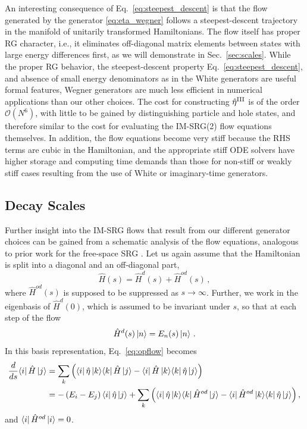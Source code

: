 An interesting consequence of Eq.~\eqref{eq:steepest_descent} is that
the flow generated by the generator \eqref{eq:eta_wegner} follows a
steepest-descent trajectory in the manifold of unitarily transformed
Hamiltonians. The flow itself has proper RG character, i.e., it
eliminates off-diagonal matrix elements between states with large
energy differences first, as we will demonstrate in
Sec.~\ref{sec:scales}. While the proper RG behavior, the
steepest-descent property Eq.~\eqref{eq:steepest_descent}, and absence
of small energy denominators as in the White generators are useful
formal features, Wegner generators are much less efficient in
numerical applications than our other choices. The cost for
constructing $\hat{\eta}^\text{III}$ is of the order $\mathcal{O}(N^6)$,
with little to be gained by distinguishing particle and hole states,
and therefore similar to the cost for evaluating the IM-SRG(2) flow
equations themselves. In addition, the flow equations become very
stiff because the RHS terms are cubic in the Hamiltonian, and the
appropriate stiff ODE solvers have higher storage and computing time
demands than those for non-stiff or weakly stiff cases resulting from
the use of White or imaginary-time generators.


\subsection{\label{sec:scales}Decay Scales}
Further insight into the IM-SRG flows that result from our different generator choices can
be gained from a schematic analysis of the flow equations, analogous to prior work for
the free-space SRG \cite{Anderson:2008hx,Bogner:2010pq}.
Let us again assume that the Hamiltonian is split into a diagonal and an off-diagonal part,
\begin{equation}
  \hat{H}(s)=\hat{H}^d(s) + \hat{H}^{od}(s)\,,
\end{equation}
where $\hat{H}^{od}(s)$ is supposed to be suppressed as $s\to\infty$. Further, we work in the eigenbasis of $\hat{H}^d(0)$, which is assumed to be invariant under $s$, so that at each step of the flow
\begin{equation}
  \hat{H}^d(s)\ket{n} = E_n(s)\ket{n}\,.
\end{equation}
In this basis representation, Eq.~\eqref{eq:opflow} becomes
\begin{align}
   \frac{d {}} {d {s}} \langle{i}|\,{\hat{H}}\,|{j}\rangle
  &=\sum_k\left(\langle{i}|\,{\hat{\eta}}\,|{k}\rangle\langle{k}|\,{\hat{H}}\,|{j}\rangle-\langle{i}|\,{\hat{H}}\,|{k}\rangle\langle{k}|\,{\hat{\eta}}\,|{j}\rangle\right)\notag\\
  &=-\left(E_i-E_j\right)\langle{i}|\,{\hat{\eta}}\,|{j}\rangle
    +\sum_k\left(\langle{i}|\,{\hat{\eta}}\,|{k}\rangle\langle{k}|\,{\hat{H}^{od}}\,|{j}\rangle-\langle{i}|\,{\hat{H}^{od}}\,|{k}\rangle\langle{k}|\,{\hat{\eta}}\,|{j}\rangle\right),
\end{align}
and $\langle{i}|\,{\hat{H}^{od}}\,|{i}\rangle=0$.

